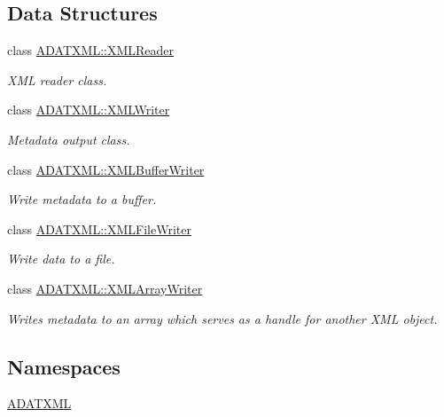 \subsection*{Data Structures}
\begin{DoxyCompactItemize}
\item 
class \mbox{\hyperlink{classADATXML_1_1XMLReader}{A\+D\+A\+T\+X\+M\+L\+::\+X\+M\+L\+Reader}}
\begin{DoxyCompactList}\small\item\em X\+ML reader class. \end{DoxyCompactList}\item 
class \mbox{\hyperlink{classADATXML_1_1XMLWriter}{A\+D\+A\+T\+X\+M\+L\+::\+X\+M\+L\+Writer}}
\begin{DoxyCompactList}\small\item\em Metadata output class. \end{DoxyCompactList}\item 
class \mbox{\hyperlink{classADATXML_1_1XMLBufferWriter}{A\+D\+A\+T\+X\+M\+L\+::\+X\+M\+L\+Buffer\+Writer}}
\begin{DoxyCompactList}\small\item\em Write metadata to a buffer. \end{DoxyCompactList}\item 
class \mbox{\hyperlink{classADATXML_1_1XMLFileWriter}{A\+D\+A\+T\+X\+M\+L\+::\+X\+M\+L\+File\+Writer}}
\begin{DoxyCompactList}\small\item\em Write data to a file. \end{DoxyCompactList}\item 
class \mbox{\hyperlink{classADATXML_1_1XMLArrayWriter}{A\+D\+A\+T\+X\+M\+L\+::\+X\+M\+L\+Array\+Writer}}
\begin{DoxyCompactList}\small\item\em Writes metadata to an array which serves as a handle for another X\+ML object. \end{DoxyCompactList}\end{DoxyCompactItemize}
\subsection*{Namespaces}
\begin{DoxyCompactItemize}
\item 
 \mbox{\hyperlink{namespaceADATXML}{A\+D\+A\+T\+X\+ML}}
\end{DoxyCompactItemize}
